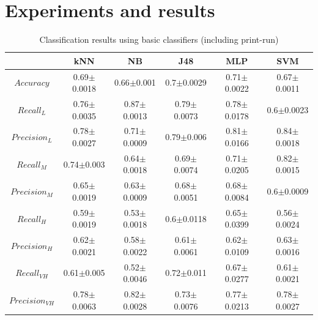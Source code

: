 \documentclass{llncs}
\begin{document}
\section{Experiments and results}




\begin{table}
\caption{Classification results using basic classifiers (including print-run)}
\begin{centering}
\begin{tabular}{|c|c|c|c|c|c|}
\hline 
 & kNN & NB & J48 & MLP & SVM\tabularnewline
\hline 
\hline 
$Accuracy$  & 0.69$\pm$0.0018 & 0.66$\pm$0.001 & 0.7$\pm$0.0029 & 0.71$\pm$0.0022 & 0.67$\pm$0.0011\tabularnewline
\hline 
\hline 
$Recall_{L}$ & 0.76$\pm$0.0035 & 0.87$\pm$0.0013 & 0.79$\pm$0.0073 & 0.78$\pm$0.0178 & 0.6$\pm$0.0023\tabularnewline
\hline 
$Precision_{L}$ & 0.78$\pm$0.0027 & 0.71$\pm$0.0009 & 0.79$\pm$0.006 & 0.81$\pm$0.0166 & 0.84$\pm$0.0018\tabularnewline
\hline 
\hline 
$Recall_{M}$ & 0.74$\pm$0.003 & 0.64$\pm$0.0018 & 0.69$\pm$0.0074 & 0.71$\pm$0.0205 & 0.82$\pm$0.0015\tabularnewline
\hline 
$Precision_{M}$ & 0.65$\pm$0.0019 & 0.63$\pm$0.0009 & 0.68$\pm$0.0051 & 0.68$\pm$0.0084 & 0.6$\pm$0.0009\tabularnewline
\hline 
\hline 
$Recall_{H}$ & 0.59$\pm$0.0019 & 0.53$\pm$0.0018 & 0.6$\pm$0.0118 & 0.65$\pm$0.0399 & 0.56$\pm$0.0024\tabularnewline
\hline 
$Precision_{H}$ & 0.62$\pm$0.0021 & 0.58$\pm$0.0022 & 0.61$\pm$0.0061 & 0.62$\pm$0.0109 & 0.63$\pm$0.0016\tabularnewline
\hline 
\hline 
$Recall_{VH}$ & 0.61$\pm$0.005 & 0.52$\pm$0.0046 & 0.72$\pm$0.011 & 0.67$\pm$0.0277 & 0.61$\pm$0.0021\tabularnewline
\hline 
$Precision_{VH}$ & 0.78$\pm$0.0063 & 0.82$\pm$0.0028 & 0.73$\pm$0.0076 & 0.77$\pm$0.0213 & 0.78$\pm$0.0027\tabularnewline
\hline 
\end{tabular}
\par\end{centering}
\end{table}
\end{document}
